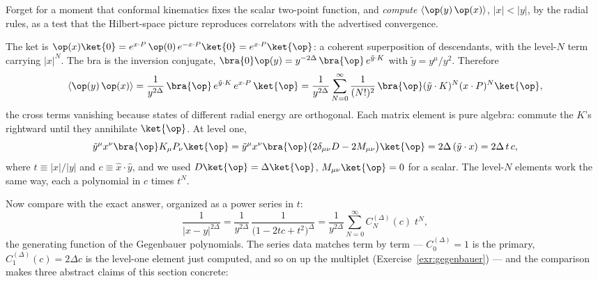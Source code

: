 \begin{eexample}
\label{ex:2pt-radial}
Forget for a moment that conformal kinematics fixes the scalar two-point
function, and \emph{compute} $\langle \op(y)\,\op(x)\rangle$, $|x| < |y|$, by
the radial rules, as a test that the Hilbert-space picture reproduces
correlators with the advertised convergence.

The ket is $\op(x)\ket{0} = e^{x\cdot P}\,\op(0)\,e^{-x\cdot P}\ket{0} =
e^{x\cdot P}\ket{\op}$: a coherent superposition of descendants, with the
level-$N$ term carrying $|x|^N$. The bra is the inversion conjugate,
$\bra{0}\op(y) = y^{-2\Delta}\,\bra{\op}\, e^{\tilde y \cdot K}$ with $\tilde
y = y^\mu/y^2$. Therefore
\begin{equation}
\langle \op(y)\, \op(x)\rangle
= \frac{1}{y^{2\Delta}}\,
\bra{\op}\, e^{\tilde y\cdot K}\, e^{x \cdot P}\,\ket{\op}
= \frac{1}{y^{2\Delta}}\sum_{N=0}^{\infty}
\frac{1}{(N!)^2}\,\bra{\op}(\tilde y\cdot K)^N (x\cdot P)^N\ket{\op},
\label{eq:2pt-matrix-elements}
\end{equation}
the cross terms vanishing because states of different radial energy are
orthogonal. Each matrix element is pure algebra: commute the $K$'s rightward
until they annihilate $\ket{\op}$. At level one,
\begin{equation}
\tilde y^\mu x^\nu \bra{\op} K_\mu P_\nu \ket{\op}
= \tilde y^\mu x^\nu \bra{\op}\big(2\delta_{\mu\nu} D - 2M_{\mu\nu}\big)\ket{\op}
= 2\Delta\, (\tilde y \cdot x)
= 2\Delta\, t\, c,
\end{equation}
where $t \equiv |x|/|y|$ and $c \equiv \hat x \cdot \hat y$, and we used
$D\ket{\op} = \Delta\ket{\op}$, $M_{\mu\nu}\ket{\op} = 0$ for a scalar. The
level-$N$ elements work the same way, each a polynomial in $c$ times $t^N$.

Now compare with the exact answer, organized as a power series in $t$:
\begin{equation}
\frac{1}{|x - y|^{2\Delta}}
= \frac{1}{y^{2\Delta}}\,\frac{1}{\big(1 - 2tc + t^2\big)^{\Delta}}
= \frac{1}{y^{2\Delta}} \sum_{N=0}^{\infty} C^{(\Delta)}_N(c)\; t^N ,
\label{eq:gegenbauer}
\end{equation}
the generating function of the Gegenbauer polynomials. The series data
matches term by term --- $C^{(\Delta)}_0 = 1$ is the primary,
$C^{(\Delta)}_1(c) = 2\Delta c$ is the level-one element just computed, and so
on up the multiplet (Exercise~\ref{exr:gegenbauer}) --- and the comparison
makes three abstract claims of this section concrete:


\end{eexample}
